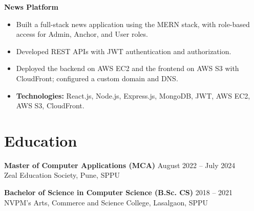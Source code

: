 \documentclass[a4paper,10pt]{article}
\begin{document}
\textbf{News Platform}
\begin{itemize}
  \item Built a full-stack news application using the MERN stack, with role-based access for Admin, Anchor, and User roles.
  \item Developed REST APIs with JWT authentication and authorization.
  \item Deployed the backend on AWS EC2 and the frontend on AWS S3 with CloudFront; configured a custom domain and DNS.
  \item \textbf{Technologies:} React.js, Node.js, Express.js, MongoDB, JWT, AWS EC2, AWS S3, CloudFront.
\end{itemize}

\section*{Education}
\textbf{Master of Computer Applications (MCA)} \hfill August 2022 -- July 2024\\
Zeal Education Society, Pune, SPPU

\vspace{5pt}
\textbf{Bachelor of Science in Computer Science (B.Sc. CS)} \hfill 2018 -- 2021\\
NVPM's Arts, Commerce and Science College, Lasalgaon, SPPU
\end{document}
